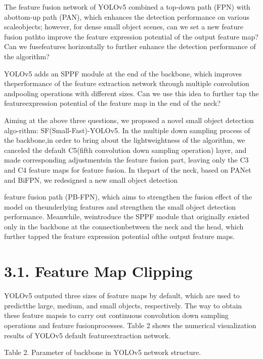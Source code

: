\documentclass[
  10
]{article}
\begin{document}
The feature fusion network of YOLOv5 combined a top-down path (FPN) with
abottom-up path (PAN), which enhances the detection performance on
various scaleobjects; however, for dense small object scenes, can we set
a new feature fusion pathto improve the feature expression potential of
the output feature map? Can we fusefeatures horizontally to further
enhance the detection performance of the algorithm?

YOLOv5 adds an SPPF module at the end of the backbone, which improves
theperformance of the feature extraction network through multiple
convolution andpooling operations with different sizes. Can we use this
idea to further tap the featureexpression potential of the feature map
in the end of the neck?

Aiming at the above three questions, we proposed a novel small object
detection algo-rithm: SF(Small-Fast)-YOLOv5. In the multiple down
sampling process of the backbone,in order to bring about the
lightweightness of the algorithm, we canceled the default C5(fifth
convolution down sampling operation) layer, and made corresponding
adjustmentsin the feature fusion part, leaving only the C3 and C4
feature maps for feature fusion. In thepart of the neck, based on PANet
and BiFPN, we redesigned a new small object detection

feature fusion path (PB-FPN), which aims to strengthen the fusion effect
of the model on theunderlying features and strengthen the small object
detection performance. Meanwhile, weintroduce the SPPF module that
originally existed only in the backbone at the connectionbetween the
neck and the head, which further tapped the feature expression potential
ofthe output feature maps.

\section{3.1. Feature Map Clipping}\label{feature-map-clipping}

YOLOv5 outputed three sizes of feature maps by default, which are used
to predictthe large, medium, and small objects, respectively. The way to
obtain these feature mapsis to carry out continuous convolution down
sampling operations and feature fusionprocesses. Table 2 shows the
numerical visualization results of YOLOv5 default featureextraction
network.

Table 2. Parameter of backbone in YOLOv5 network structure.
\end{document}
